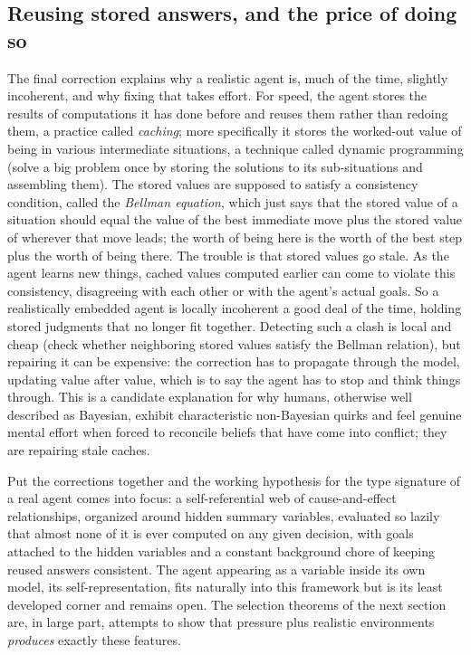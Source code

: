 \documentclass[10pt]{article}
\theoremstyle{definition}
\theoremstyle{remark}
\begin{document}
\subsection{Reusing stored answers, and the price of doing so}

The final correction explains why a realistic agent is, much of the time, slightly incoherent, and why fixing that takes effort. For speed, the agent stores the results of computations it has done before and reuses them rather than redoing them, a practice called \emph{caching}; more specifically it stores the worked-out value of being in various intermediate situations, a technique called dynamic programming (solve a big problem once by storing the solutions to its sub-situations and assembling them). The stored values are supposed to satisfy a consistency condition, called the \emph{Bellman equation}, which just says that the stored value of a situation should equal the value of the best immediate move plus the stored value of wherever that move leads; the worth of being here is the worth of the best step plus the worth of being there. The trouble is that stored values go stale. As the agent learns new things, cached values computed earlier can come to violate this consistency, disagreeing with each other or with the agent's actual goals. So a realistically embedded agent is locally incoherent a good deal of the time, holding stored judgments that no longer fit together. Detecting such a clash is local and cheap (check whether neighboring stored values satisfy the Bellman relation), but repairing it can be expensive: the correction has to propagate through the model, updating value after value, which is to say the agent has to stop and think things through. This is a candidate explanation for why humans, otherwise well described as Bayesian, exhibit characteristic non-Bayesian quirks and feel genuine mental effort when forced to reconcile beliefs that have come into conflict; they are repairing stale caches.

Put the corrections together and the working hypothesis for the type signature of a real agent comes into focus: a self-referential web of cause-and-effect relationships, organized around hidden summary variables, evaluated so lazily that almost none of it is ever computed on any given decision, with goals attached to the hidden variables and a constant background chore of keeping reused answers consistent. The agent appearing as a variable inside its own model, its self-representation, fits naturally into this framework but is its least developed corner and remains open. The selection theorems of the next section are, in large part, attempts to show that pressure plus realistic environments \emph{produces} exactly these features.
\end{document}
